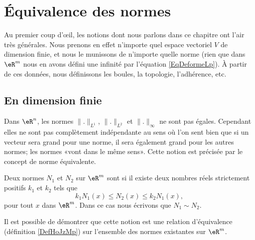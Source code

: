 
\section{Équivalence des normes}
\label{normes_equiv}

Au premier coup d'œil, les notions dont nous parlons dans ce chapitre ont l'air très générales. Nous prenons en effet n'importe quel espace vectoriel $V$ de dimension finie, et nous le munissons de n'importe quelle norme (rien que dans $\eR^m$ nous en avons défini une infinité par l'équation \eqref{EqDeformeLp}). À partir de ces données, nous définissons les boules, la topologie, l'adhérence, etc.

\subsection{En dimension finie}

Dans $\eR^n$, les normes $\| . \|_{L^1}$, $\| . \|_{L^2}$ et $\| . \|_{\infty}$ ne sont pas égales. Cependant elles ne sont pas complètement indépendante au sens où l'on sent bien que si un vecteur sera grand pour une norme, il sera également grand pour les autres normes; les normes «vont dans le même sens». Cette notion est précisée par le concept de norme équivalente. 

\begin{definition}		\label{DefEquivNorm}
    Deux normes $N_1$ et $N_2$ sur $\eR^m$ sont  si il existe deux nombres réels strictement positifs $k_1$ et $k_2$ tels que
	\begin{equation}
		k_1N_1(x)\leq N_2(x)\leq k_2 N_1(x),
	\end{equation}
	pour tout $x$ dans $\eR^m$. Dans ce cas nous écrivons que $N_1\sim N_2$.
\end{definition}
Il est possible de démontrer que cette notion est une relation d'équivalence (définition \ref{DefHoJzMp}) sur l'ensemble des normes existantes sur $\eR^m$.

